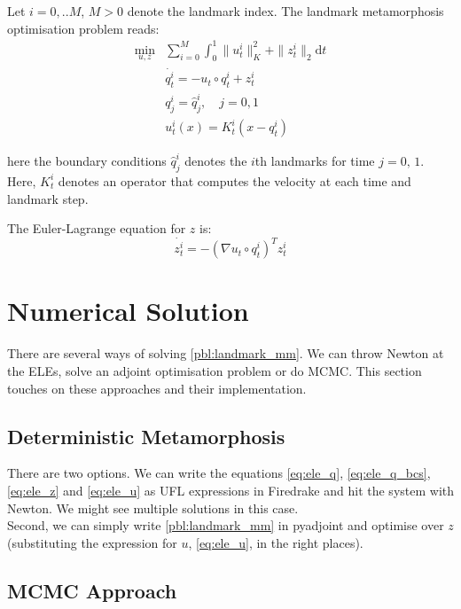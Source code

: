 \documentclass{article}
\newcommand{\norm}[2]{\| #1 \|_{ #2 }}
\newcommand{\knorm}[1]{\norm{ #1 }{K}}
\newcommand{\ltwonorm}[1]{\norm{ #1 }{2}}
\newcommand{\diff}[1]{\text{d} #1}
\begin{document}
Let $i=0,..M$, $M>0$ denote the landmark index. The landmark metamorphosis 
optimisation problem reads:
\begin{subequations}\label{pbl:landmark_mm}
\begin{align}
\min_{u, z} & \sum_{i=0}^M \int_0^1 \knorm{u^i_t}^2 + \ltwonorm{z^i_t} \diff{t}\\
            & \dot{q^i_t} = - u_t \circ q^i_t + z^i_t \label{eq:ele_q} \\
            & q^i_j = \hat q^i_j, \quad j=0,1 \label{eq:ele_q_bcs}\\
            & u^i_t(x) = K^i_t(x - q^i_t) \label{eq:ele_u}
\end{align}
\end{subequations}

here the boundary conditions $\hat q^i_j$ denotes the $i$th landmarks for time
$j=0,\,1$. Here, $K^i_t$ denotes an operator that computes the velocity at each time
and landmark step.

The Euler-Lagrange equation for $z$ is:
\begin{equation}\label{eq:ele_z}
\dot{z^i_t} = - (\nabla u_t \circ q^i_t)^T z^i_t
\end{equation}

\section{Numerical Solution}

There are several ways of solving \eqref{pbl:landmark_mm}. We can throw Newton
at the ELEs, solve an adjoint optimisation problem or do MCMC. This section
touches on these approaches and their implementation.

\subsection{Deterministic Metamorphosis}

There are two options. We can write the equations \eqref{eq:ele_q},
\eqref{eq:ele_q_bcs}, \eqref{eq:ele_z} and \eqref{eq:ele_u} as UFL expressions
in Firedrake and hit the system with Newton. We might see multiple solutions in
this case.\\

Second, we can simply write \eqref{pbl:landmark_mm} in pyadjoint and optimise
over $z$ (substituting the expression for $u$, \eqref{eq:ele_u}, in the right
places).

\subsection{MCMC Approach}
\end{document}
